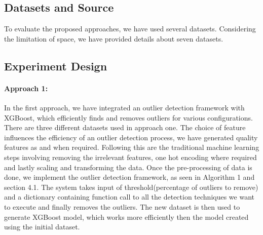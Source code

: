 \documentclass[runningheads]{llncs}
\begin{document}
\subsection{Datasets and Source}

To evaluate the proposed approaches, we have used several datasets. Considering the limitation of space, we have provided details about seven datasets.





\subsection{Experiment Design}


\paragraph{Approach 1:} In the first approach, we have integrated an outlier detection framework with XGBoost, which efficiently finds and removes outliers for various configurations. There are three different datasets used in approach one. The choice of feature influences the efficiency of an outlier detection process, we have generated quality features as and when required. Following this are the traditional machine learning steps involving removing the irrelevant features, one hot encoding where required and lastly scaling and transforming the data. Once the pre-processing of data is done, we implement the outlier detection framework, as seen in Algorithm 1 and section 4.1. The system takes input of threshold(percentage of outliers to remove) and a dictionary containing function call to all the detection techniques we want to execute and finally removes the outliers. The new dataset is then used to generate XGBoost model, which works more efficiently then the model created using the initial dataset. 
\end{document}
